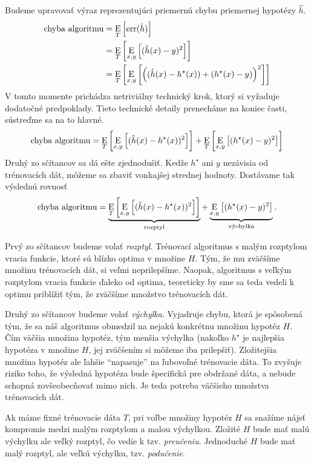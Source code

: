 Budeme upravovať výraz reprezentujúci priemernú chybu priemernej
hypotézy $\hat{h}$.
\begin{align}
  \chalg %
    &= \E_T \left[ \err(\hat{h}) \right] \\
    &= \E_T \left[ \E_{x,y} \left[ (\hat{h}(x) - y)^2 \right] \right] \\
    &= \E_T \left[ \E_{x,y} \left[ \left( (\hat{h}(x) - h^\star(x)) + (h^\star(x) - y) \right)^2 \right] \right]
\end{align}
V tomto momente prichádza netriviálny technický krok, ktorý si
vyžaduje dodatočné predpoklady. Tieto technické detaily prenecháme
na koniec časti, sústreďme sa na to hlavné.
$$
  \text{\normalfont chyba algoritmu}
    = \operatorname*{\mathrm{E}}_T \left[ \operatorname*{\mathrm{E}}_{x,y} \left[ (\hat{h}(x) - h^\star(x))^2 \right] \right]
    + \operatorname*{\mathrm{E}}_T \left[ \operatorname*{\mathrm{E}}_{x,y} \left[ (h^\star(x) - y)^2 \right] \right]
$$
Druhý zo sčítancov sa dá ešte zjednodušiť. Kedže $h^\star$ ani $y$
nezávisia od trénovacích dát, môžeme sa zbaviť vonkajšej strednej
hodnoty. Dostávame tak výslednú rovnosť
$$
  \text{\normalfont chyba algoritmu}
    = \underbrace{\operatorname*{\mathrm{E}}_T \left[ \operatorname*{\mathrm{E}}_{x,y} \left[ (\hat{h}(x) - h^\star(x))^2 \right] \right]}_{\text{rozptyl}}
    + \underbrace{\operatorname*{\mathrm{E}}_{x,y} \left[ (h^\star(x) - y)^2 \right]}_{\text{výchylka}}.
$$

Prvý zo sčítancov budeme volať \emph{rozptyl}. Trénovací algoritmus
s malým rozptylom vracia funkcie, ktoré sú blízko optima v množine $H$.
Tým, že mu zväčšíme množinu trénovacích dát, si veľmi neprilepšíme.
Naopak, algoritmus s veľkým rozptylom vracia funkcie ďaleko od optima,
teoreticky by sme sa teda vedeli k optimu priblížiť tým, že zväčšíme
množstvo trénovacích dát.

\medskip

Druhý zo sčítancov budeme volať \emph{výchylka}. Vyjadruje chybu, ktorá
je spôsobená tým, že sa náš algoritmus obmedzil na nejakú konkrétnu
množinu hypotéz $H$. Čím väčšia množina hypotéz, tým menšia výchylka
(nakoľko $h^\star$ je najlepšia hypotéza v množine $H$, jej zväčšením
si môžeme iba prilepšiť). Zložitejšia množina hypotéz ale ľahšie
``napasuje'' na ľubovoľné trénovacie dáta. To zvyšuje riziko toho,
že výsledná hypotéza bude špecifická pre obdržané dáta, a nebude
schopná zovšeobecňovať mimo nich. Je teda potreba väčšieho množstva
trénovacích dát.

\medskip

Ak máme fixné trénovacie dáta $T$, pri voľbe množiny hypotéz $H$ sa snažíme
nájsť kompromis medzi malým rozptylom a malou výchylkou. Zložité $H$
bude mať malú výchylku ale veľký rozptyl, čo vedie k tzv. \emph{preučeniu}.
Jednoduché $H$ bude mať malý rozptyl, ale veľkú výchylku, tzv. \emph{podučenie}.

